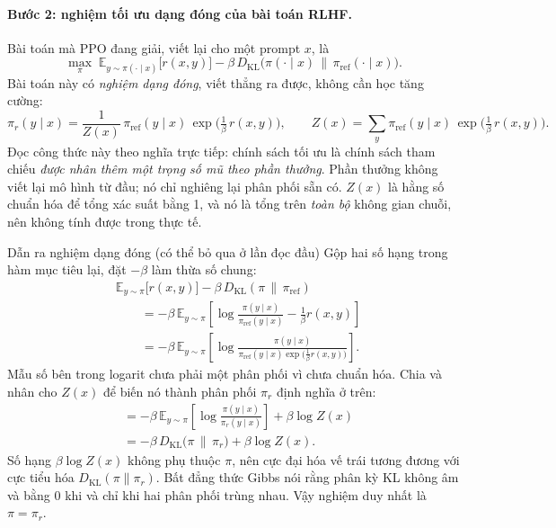 \paragraph{Bước 2: nghiệm tối ưu dạng đóng của bài toán RLHF.}
Bài toán mà PPO đang giải, viết lại cho một prompt \( x \), là
\[
    \max_{\pi}\;
    \mathbb{E}_{y \sim \pi(\cdot \mid x)}\big[ r(x,y) \big]
    - \beta\, D_{\text{KL}}\big(\pi(\cdot \mid x) \,\big\|\, \pi_{\text{ref}}(\cdot \mid x)\big).
\]
Bài toán này có \emph{nghiệm dạng đóng}, viết thẳng ra được, không cần học tăng cường:
\[
    \pi_r(y \mid x) = \frac{1}{Z(x)}\, \pi_{\text{ref}}(y \mid x)\,
    \exp\!\Big( \tfrac{1}{\beta}\, r(x,y) \Big),
    \qquad
    Z(x) = \sum_{y} \pi_{\text{ref}}(y \mid x)\, \exp\!\Big( \tfrac{1}{\beta}\, r(x,y) \Big).
\]
Đọc công thức này theo nghĩa trực tiếp: chính sách tối ưu là chính sách tham chiếu \emph{được nhân thêm một trọng số mũ theo phần thưởng}. Phần thưởng không viết lại mô hình từ đầu; nó chỉ nghiêng lại phân phối sẵn có. \( Z(x) \) là hằng số chuẩn hóa để tổng xác suất bằng 1, và nó là tổng trên \emph{toàn bộ} không gian chuỗi, nên không tính được trong thực tế.

\begin{deepdive}{Dẫn ra nghiệm dạng đóng (có thể bỏ qua ở lần đọc đầu)}
Gộp hai số hạng trong hàm mục tiêu lại, đặt \( -\beta \) làm thừa số chung:
\[
\begin{aligned}
    &\mathbb{E}_{y \sim \pi}\big[ r(x,y) \big] - \beta\, D_{\text{KL}}(\pi \,\|\, \pi_{\text{ref}}) \\[4pt]
    &\qquad = -\beta\, \mathbb{E}_{y \sim \pi}\left[ \log \frac{\pi(y \mid x)}{\pi_{\text{ref}}(y \mid x)} - \frac{1}{\beta} r(x,y) \right] \\[4pt]
    &\qquad = -\beta\, \mathbb{E}_{y \sim \pi}\left[ \log \frac{\pi(y \mid x)}{\pi_{\text{ref}}(y \mid x)\exp\big(\frac{1}{\beta} r(x,y)\big)} \right].
\end{aligned}
\]
Mẫu số bên trong logarit chưa phải một phân phối vì chưa chuẩn hóa. Chia và nhân cho \( Z(x) \) để biến nó thành phân phối \( \pi_r \) định nghĩa ở trên:
\[
\begin{aligned}
    &= -\beta\, \mathbb{E}_{y \sim \pi}\left[ \log \frac{\pi(y \mid x)}{\pi_r(y \mid x)} \right] + \beta \log Z(x) \\[4pt]
    &= -\beta\, D_{\text{KL}}\big(\pi \,\|\, \pi_r\big) + \beta \log Z(x).
\end{aligned}
\]
Số hạng \( \beta \log Z(x) \) không phụ thuộc \( \pi \), nên cực đại hóa vế trái tương đương với cực tiểu hóa \( D_{\text{KL}}(\pi \| \pi_r) \). Bất đẳng thức Gibbs nói rằng phân kỳ KL không âm và bằng 0 khi và chỉ khi hai phân phối trùng nhau. Vậy nghiệm duy nhất là \( \pi = \pi_r \).
\end{deepdive}

